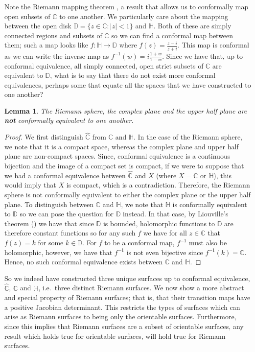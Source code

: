 \documentclass[11pt]{report}
\newtheorem{lemma}[thm]{Lemma}
\theoremstyle{definition}
\begin{document}
Note the Riemann mapping theorem \cite[p.221]{ahlfors}, a result that allows us to conformally map open subsets of $\mathbb{C}$ to one another. We particularly care about the mapping between the open disk $\mathbb{D}=\{z \in \mathbb{C} \colon |z| < 1\}$ and $\mathbb{H}$. Both of these are simply connected regions and subsets of $\mathbb{C}$ so we can find a conformal map between them; such a map looks like $f:\mathbb{H} \rightarrow \mathbb{D}$ where $f(z) = \frac{z-i}{z+i}$. This map is conformal as we can write the inverse map as $f^{-1}(w) = i\frac{1+w}{1-w}$.
Since we have that, up to conformal equivalence, all simply connected, open strict subsets of $\mathbb{C}$ are equivalent to $\mathbb{D}$, what is to say that there do not exist more conformal equivalences, perhaps some that equate all the spaces that we have constructed to one another? 
\begin{lemma}
  The Riemann sphere, the complex plane and the upper half plane are \textbf{not} conformally equivalent to one another.
\end{lemma}
\begin{proof}
  We first distinguish $\widehat{\mathbb{C}}$ from $\mathbb{C}$ and $\mathbb{H}$. In the case of the Riemann sphere, we note that it is a compact space, whereas the complex plane and upper half plane are non-compact spaces. Since, conformal equivalence is a continuous bijection and the image of a compact set is compact, if we were to suppose that we had a conformal equivalence between $\widehat{\mathbb{C}}$ and $X$ (where $X = \mathbb{C}$ or $\mathbb{H}$), this would imply that $X$ is compact, which is a contradiction. Therefore, the Riemann sphere is not conformally equivalent to either the complex plane or the upper half plane. 
  To distinguish between $\mathbb{C}$ and $\mathbb{H}$, we note that $\mathbb{H}$ is conformally equivalent to $\mathbb{D}$ so we can pose the question for $\mathbb{D}$ instead. In that case, by Liouville's theorem (\cite[p.122]{ahlfors}) we have that since $\mathbb{D}$ is bounded, holomorphic functions to $\mathbb{D}$ are therefore constant functions so for any such $f$ we have for all $z \in \mathbb{C}$ that $f(z) = k$ for some $k \in \mathbb{D}$. For $f$ to be a conformal map, $f^{-1}$ must also be holomorphic, however, we have that $f^{-1}$ is not even bijective since $f^{-1}(k) = \mathbb{C}$. Hence, no such conformal equivalence exists between $\mathbb{C}$ and $\mathbb{H}$. 
\end{proof}
So we indeed have constructed three unique surfaces up to conformal equivalence, $\widehat{\mathbb{C}}$, $\mathbb{C}$ and $\mathbb{H}$, i.e.\ three distinct Riemann surfaces. We now show a more abstract and special property of Riemann surfaces; that is, that their transition maps have a positive Jacobian determinant. This restricts the types of surfaces which can arise as Riemann surfaces to being only the orientable surfaces. Furthermore, since this implies that Riemann surfaces are a subset of orientable surfaces, any result which holds true for orientable surfaces, will hold true for Riemann surfaces. 
\end{document}
